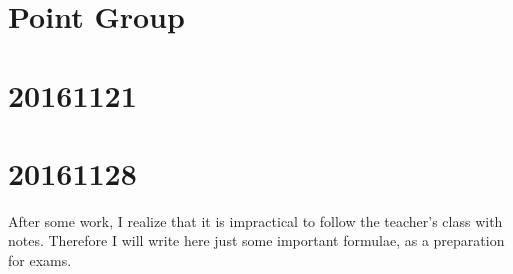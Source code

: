 \documentclass{article}
\begin{document}
\section{Point Group}
\label{sec:Point-Group}


\section{20161121}

\section{20161128}
\label{sec:20161128}
After some work, I realize that it is impractical to follow the
teacher's class with notes. Therefore I will write here just some
important formulae, as a preparation for exams.
\end{document}
